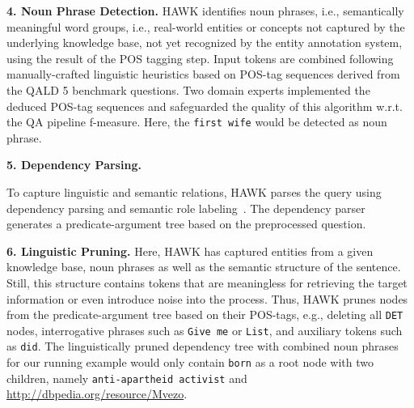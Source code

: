 \textbf{4. Noun Phrase Detection.}
HAWK identifies noun phrases, i.e., semantically meaningful word groups, i.e., real-world entities or concepts not captured by the underlying knowledge base, not yet recognized by the entity annotation system, using the result of the POS tagging step. 
Input tokens are combined following manually-crafted linguistic heuristics based on POS-tag sequences derived from the QALD 5 benchmark questions. %
Two domain experts implemented the deduced POS-tag sequences and safeguarded the quality of this algorithm w.r.t. the QA pipeline f-measure. 
Here, the \texttt{first wife} would be detected as noun phrase.

\textbf{5. Dependency Parsing.}

To capture linguistic and semantic relations, HAWK parses the query using dependency parsing and semantic role labeling~\cite{choi2011getting}.
The dependency parser generates a predicate-argument tree based on the preprocessed question.

\textbf{6. Linguistic Pruning.}
Here, HAWK has captured entities from a given knowledge base, noun phrases as well as the semantic structure of the sentence. 
Still, this structure contains tokens that are meaningless for retrieving the target information or even introduce noise into the process.
Thus, HAWK prunes nodes from the predicate-argument tree based on their POS-tags, e.g., deleting all \texttt{DET} nodes, interrogative phrases such as \texttt{Give me} or \texttt{List}, and auxiliary tokens such as \texttt{did}.
The linguistically pruned dependency tree with combined noun phrases for our running example would only contain \texttt{born} as a root node with two children, namely \texttt{anti-apartheid activist} and \url{http://dbpedia.org/resource/Mvezo}.

